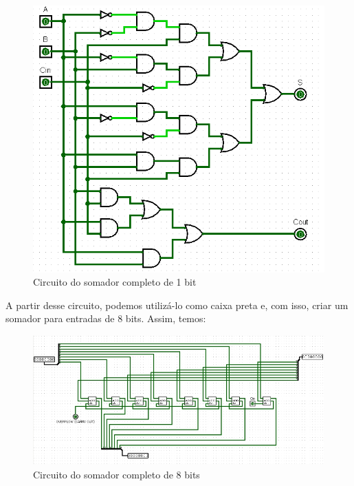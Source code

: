 \documentclass[
	12pt,				%
	openright,			%
	twoside,			%
	a4paper,			%
	english,			%
	french,				%
	spanish,			%
	brazil,				%
	]{abntex2}
\begin{document}
\begin{figure}[H]
	\begin{center}
	    \includegraphics[scale=0.5]{imagens/somador1b.png}
	\end{center}
\caption{\label{somador1b}Circuito do somador completo de 1 bit}
\end{figure}

A partir desse circuito, podemos utilizá-lo como caixa preta e, com isso, criar um somador para entradas de 8 bits. Assim, temos:

\begin{figure}[H]
	\begin{center}
	    \includegraphics[scale=0.5]{imagens/somador8b.png}
	\end{center}
\caption{\label{somador8b}Circuito do somador completo de 8 bits}
\end{figure}
\end{document}
